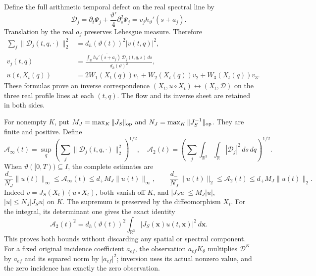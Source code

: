 Define the full arithmetic temporal defect on the real
spectral line by
\[
 \mathscr D_j=\partial_t\Psi_j+
                \frac{\vartheta'}4\partial_s^2\Psi_j
        =v_j h_{\vartheta}'(s+a_j).
\]
Translation by the real $a_j$ preserves Lebesgue measure.
Therefore
\begin{equation}
\begin{aligned}
 \sum_j\|\mathscr D_j(t,q,\cdot)\|_2^2
       &=d_h(\vartheta(t))^2|v(t,q)|^2,\\
 v_j(t,q)&=\frac{\int_{\mathbb R}
       \overline{h_{\vartheta}'(s+a_j)}\,\mathscr D_j(t,q,s)\,ds}
                {d_h(\vartheta)^2},\\
 u(t,X_t(q))&=2W_1(X_t(q))v_1+
                    W_2(X_t(q))v_2+W_3(X_t(q))v_3 .
\end{aligned}
\label{eq:cq-NS-exact-velocity-recovery}
\end{equation}
These formulas prove an inverse correspondence
$(X_t,u\circ X_t)\leftrightarrow(X_t,\mathscr D)$ on the
three real profile lines at each $(t,q)$. The flow and its
inverse sheet are retained in both sides.

For nonempty $K$, put
$M_J=\max_K\|J_S\|_{\rm op}$ and
$N_J=\max_K\|J_S^{-1}\|_{\rm op}$.
They are finite and positive. Define
\[
 \mathcal A_\infty(t)=
 \sup_q\left(\sum_j\|\mathscr D_j(t,q,\cdot)\|_2^2\right)^{1/2},
 \quad
 \mathcal A_2(t)=
 \left(\sum_j\int_{\mathbb R^3}\int_{\mathbb R}
               |\mathscr D_j|^2\,ds\,dq\right)^{1/2}.
\]
When $\vartheta([0,T))\subseteq I$, the complete estimates are
\begin{equation}
 \frac{d_-}{N_J}\|u(t)\|_\infty\leq\mathcal A_\infty(t)
       \leq d_+M_J\|u(t)\|_\infty,\qquad
 \frac{d_-}{N_J}\|u(t)\|_2\leq\mathcal A_2(t)
       \leq d_+M_J\|u(t)\|_2 .
 \label{eq:cq-NS-energy-and-supremum}
\end{equation}
Indeed $v=J_S(X_t)(u\circ X_t)$, both vanish off $K$,
and $|J_Su|\leq M_J|u|$, $|u|\leq N_J|J_Su|$ on $K$.
The supremum is preserved by the diffeomorphism $X_t$.
For the integral, its determinant one gives the exact identity
\[
 \mathcal A_2(t)^2
 =d_h(\vartheta(t))^2
           \int_{\mathbb R^3}|J_S(\mathbf x)u(t,\mathbf x)|^2\,d\mathbf x .
\]
This proves both bounds without discarding any spatial or
spectral component. For a fixed original incidence coefficient
$a_{ef}$, the observation $a_{ef}K_\theta$ multiplies
$\mathscr D^K$ by $a_{ef}$ and its squared norm by
$|a_{ef}|^2$; inversion uses its actual nonzero value, and
the zero incidence has exactly the zero observation.

